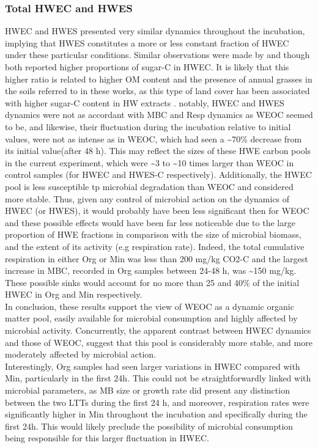 \documentclass[12pt]{report}
\begin{document}
\subsubsection{Total HWEC and HWES}

HWEC and HWES presented very similar dynamics throughout the incubation, implying that HWES constitutes  a more or less constant fraction of HWEC under these particular conditions. Similar observations were made by \citet{haynes2005} and \citet{ghani2000, ghani2003} though both reported higher proportions of sugar-C in HWEC. It is likely that this higher ratio is related to higher OM content and the presence of annual grasses in the soils referred to in these works, as this type of land cover has been associated with higher sugar-C content in HW extracts \citep{haynes1993}.
notably, HWEC and HWES dynamics were not as accordant with MBC and Resp dynamics as WEOC seemed to be, and likewise, their fluctuation during the incubation relative to initial values, were not as intense as in WEOC, which had seen a \~{}70\% decrease from its initial value(after 48 h). This may reflect the sizes of these HWE carbon pools in the current experiment, which were \~{}3 to \~{}10 times larger than WEOC in control samples (for HWEC and HWES-C respectively). Additionally, the HWEC pool is less susceptible tp microbial degradation than WEOC and  considered more stable. Thus, given any control of microbial action on the dynamics of HWEC (or HWES), it would probably have been less significant then for WEOC and these possible effects would have been far less noticeable due to the large proportion of HWE fractions in comparison with the size of microbial biomass, and the extent of its activity (e.g respiration rate). Indeed, the total cumulative respiration  in either Org or Min was less than 200 mg/kg CO2-C and the largest increase in MBC, recorded in Org samples between 24-48 h, was \~{}150 mg/kg. These possible sinks would account for no more than 25 and 40\% of the initial HWEC in Org and Min respectively. \\
In conclusion, these results support the view of WEOC as a dynamic organic matter pool, easily available for microbial consumption and highly affected by microbial activity. Concurrently, the apparent contrast between HWEC dynamics and those of WEOC, suggest that this pool is considerably more stable, and more moderately affected by microbial action.\\
Interestingly, Org samples had seen larger variations in HWEC compared with Min, particularly in the first 24h. This could not be straightforwardly linked with microbial parameters, as MB size or growth rate did present any distinction between the two LTTs during the first 24 h, and moreover, respiration rates were significantly higher in Min throughout the incubation and specifically during the first 24h. This would likely preclude the possibility of microbial consumption being responsible for this larger fluctuation in HWEC.
\end{document}
